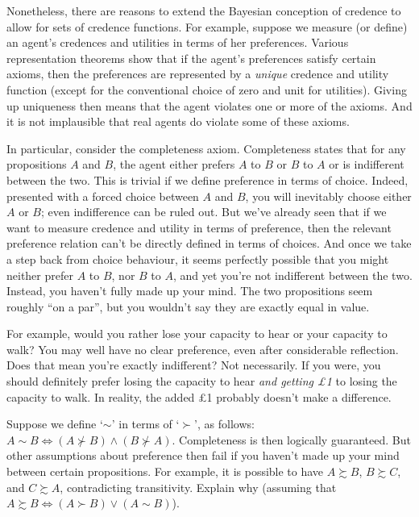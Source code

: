 Nonetheless, there are reasons to extend the Bayesian conception of
credence to allow for sets of credence functions. For example, suppose
we measure (or define) an agent's credences and utilities in terms of
her preferences. Various representation theorems show that if the
agent's preferences satisfy certain axioms, then the preferences are
represented by a \emph{unique} credence and utility function (except
for the conventional choice of zero and unit for utilities). Giving up
uniqueness then means that the agent violates one or more of the
axioms. And it is not implausible that real agents do violate some of
these axioms.

In particular, consider the completeness axiom. Completeness states
that for any propositions $A$ and $B$, the agent either prefers $A$ to
$B$ or $B$ to $A$ or is indifferent between the two. This is trivial
if we define preference in terms of choice. Indeed, presented with a
forced choice between $A$ and $B$, you will inevitably choose either
$A$ or $B$; even indifference can be ruled out. But we've already seen
that if we want to measure credence and utility in terms of
preference, then the relevant preference relation can't be directly
defined in terms of choices. And once we take a step back from choice
behaviour, it seems perfectly possible that you might neither prefer
$A$ to $B$, nor $B$ to $A$, and yet you're not indifferent between the
two. Instead, you haven't fully made up your mind. The two
propositions seem roughly ``on a par'', but you wouldn't say they are
exactly equal in value.

For example, would you rather lose your capacity to hear or your
capacity to walk? You may well have no clear preference, even after
considerable reflection. Does that mean you're exactly indifferent?
Not necessarily. If you were, you should definitely prefer losing the
capacity to hear \emph{and getting £1} to losing the capacity to
walk. In reality, the added £1 probably doesn't make a difference.

\begin{exercise2}
  Suppose we define `$\sim$' in terms of `$\succ$', as follows: $A\sim
  B \Leftrightarrow (A \not\succ B) \land (B \not\succ
  A)$. Completeness is then logically guaranteed. But other
  assumptions about preference then fail if you haven't made up your
  mind between certain propositions. For example, it is possible to
  have $A \succsim B$, $B \succsim C$, and $C \succsim A$,
  contradicting transitivity. Explain why (assuming that $A \succsim B
  \Leftrightarrow (A \succ B) \lor (A \sim B)$).
\end{exercise2}

